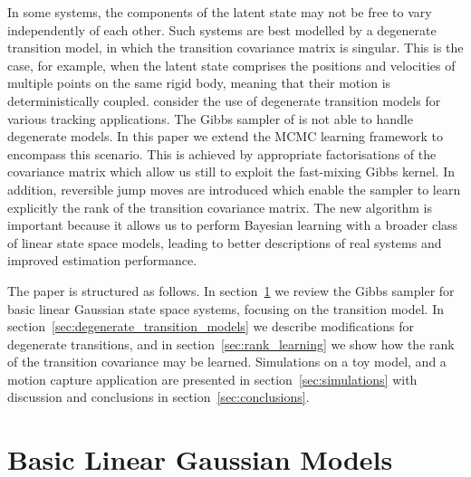 \documentclass[journal,10pt]{IEEEtran}
\begin{document}
In some systems, the components of the latent state may not be free to vary independently of each other. Such systems are best modelled by a degenerate transition model, in which the transition covariance matrix is singular. This is the case, for example, when the latent state comprises the positions and velocities of multiple points on the same rigid body, meaning that their motion is deterministically coupled. \cite{Maskell2004,Gustafsson2002} consider the use of degenerate transition models for various tracking applications. The Gibbs sampler of \cite{Wills2012} is not able to handle degenerate models. In this paper we extend the MCMC learning framework to encompass this scenario. This is achieved by appropriate factorisations of the covariance matrix which allow us still to exploit the fast-mixing Gibbs kernel. In addition, reversible jump moves \cite{Green1995,Green2009} are introduced which enable the sampler to learn explicitly the rank of the transition covariance matrix. The new algorithm is important because it allows us to perform Bayesian learning with a broader class of linear state space models, leading to better descriptions of real systems and improved estimation performance.


The paper is structured as follows. In section~\ref{sec:linear_gaussian_models} we review the Gibbs sampler for basic linear Gaussian state space systems, focusing on the transition model. In section~\ref{sec:degenerate_transition_models} we describe modifications for degenerate transitions, and in section~\ref{sec:rank_learning} we show how the rank of the transition covariance may be learned. Simulations on a toy model, and a motion capture application are presented in section~\ref{sec:simulations} with discussion and conclusions in section~\ref{sec:conclusions}.





\section{Basic Linear Gaussian Models} \label{sec:linear_gaussian_models}
\end{document}
